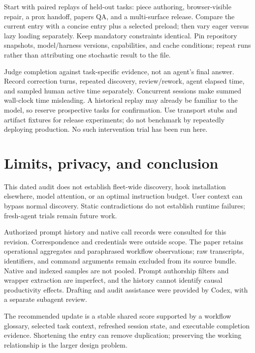 \documentclass[10pt,letterpaper,twocolumn]{article}
\begin{document}
Start with paired replays of held-out tasks: piece authoring, browser-visible repair, a prox handoff, papers QA, and a multi-surface release. Compare the current entry with a concise entry plus a selected preload; then vary eager versus lazy loading separately. Keep mandatory constraints identical. Pin repository snapshots, model/harness versions, capabilities, and cache conditions; repeat runs rather than attributing one stochastic result to the file.

Judge completion against task-specific evidence, not an agent's final answer. Record correction turns, repeated discovery, review/rework, agent elapsed time, and sampled human active time separately. Concurrent sessions make summed wall-clock time misleading. A historical replay may already be familiar to the model, so reserve prospective tasks for confirmation. Use transport stubs and artifact fixtures for release experiments; do not benchmark by repeatedly deploying production. No such intervention trial has been run here.

\section{Limits, privacy, and conclusion}
This dated audit does not establish fleet-wide discovery, hook installation elsewhere, model attention, or an optimal instruction budget. User context can bypass normal discovery. Static contradictions do not establish runtime failures; fresh-agent trials remain future work.

Authorized prompt history and native call records were consulted for this revision. Correspondence and credentials were outside scope. The paper retains operational aggregates and paraphrased workflow observations; raw transcripts, identifiers, and command arguments remain excluded from its source bundle. Native and indexed samples are not pooled. Prompt authorship filters and wrapper extraction are imperfect, and the history cannot identify causal productivity effects. Drafting and audit assistance were provided by Codex, with a separate subagent review.

The recommended update is a stable shared score supported by a workflow glossary, selected task context, refreshed session state, and executable completion evidence. Shortening the entry can remove duplication; preserving the working relationship is the larger design problem.
\end{document}
